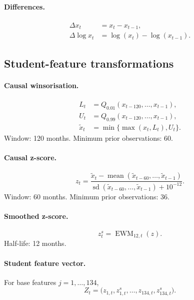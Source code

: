 \paragraph{Differences.}
\begin{align}
\Delta x_t
&=
x_t-x_{t-1}, \\
\Delta\log x_t
&=
\log(x_t)-\log(x_{t-1}).
\end{align}

\subsection{Student-feature transformations}
\label{app:student-feature-transformations}

\paragraph{Causal winsorisation.}
\begin{align}
L_t
&=
Q_{0.01}(x_{t-120},\ldots,x_{t-1}), \\
U_t
&=
Q_{0.99}(x_{t-120},\ldots,x_{t-1}), \\
\widetilde{x}_t
&=
\min\{\max(x_t,L_t),U_t\}.
\end{align}
Window: 120 months. Minimum prior observations: 60.

\paragraph{Causal z-score.}
\begin{equation}
z_t
=
\frac{
\widetilde{x}_t-
\operatorname{mean}(\widetilde{x}_{t-60},\ldots,\widetilde{x}_{t-1})
}{
\operatorname{sd}(\widetilde{x}_{t-60},\ldots,\widetilde{x}_{t-1})+10^{-12}
}.
\end{equation}
Window: 60 months. Minimum prior observations: 36.

\paragraph{Smoothed z-score.}
\begin{equation}
z^s_t
=
\operatorname{EWM}_{12,t}(z).
\end{equation}
Half-life: 12 months.

\paragraph{Student feature vector.}
For base features \(j=1,\ldots,134\),
\begin{equation}
Z_t
=
\bigl(z_{1,t},z^s_{1,t},\ldots,z_{134,t},z^s_{134,t}\bigr).
\end{equation}

